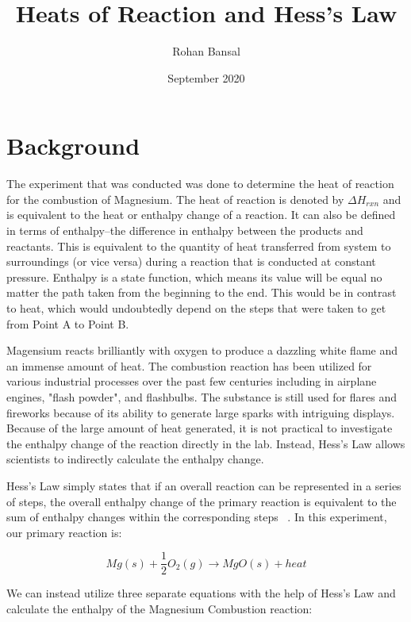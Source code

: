 \documentclass[12pt]{article}
\title{Heats of Reaction and Hess's Law}
\author{Rohan Bansal}
\date{September 2020}
\begin{document}
\maketitle

\section{Background}
	The experiment that was conducted was done to determine the heat of reaction for the combustion of Magnesium. The heat of reaction is denoted by $\Delta H_{rxn}$ and is equivalent to the heat or enthalpy change of a reaction. It can also be defined in terms of enthalpy--the difference in enthalpy between the products and reactants. This is equivalent to the quantity of heat transferred from system to surroundings (or vice versa) during a reaction that is conducted at constant pressure. Enthalpy is a state function, which means its value will be equal no matter the path taken from the beginning to the end. This would be in contrast to heat, which would undoubtedly depend on the steps that were taken to get from Point A to Point B. 

	Magensium reacts brilliantly with oxygen to produce a dazzling white flame and an immense amount of heat. The combustion reaction has been utilized for various industrial processes over the past few centuries including in airplane engines, "flash powder", and flashbulbs. The substance is still used for flares and fireworks because of its ability to generate large sparks with intriguing displays. Because of the large amount of heat generated, it is not practical to investigate the enthalpy change of the reaction directly in the lab. Instead, Hess's Law allows scientists to indirectly calculate the enthalpy change.

	Hess's Law simply states that if an overall reaction can be represented in a series of steps, the overall enthalpy change of the primary reaction is equivalent to the sum of enthalpy changes within the corresponding steps ~\parencite{chemistry_libretexts_2020}. In this experiment, our primary reaction is:

	\begin{equation}
	\label{eq:magnesium-combustion}
	Mg(s) + \frac{1}{2}O_2(g) \rightarrow MgO(s) + heat
	\end{equation}

	We can instead utilize three separate equations with the help of Hess's Law and calculate the enthalpy of the Magnesium Combustion reaction:
\end{document}
